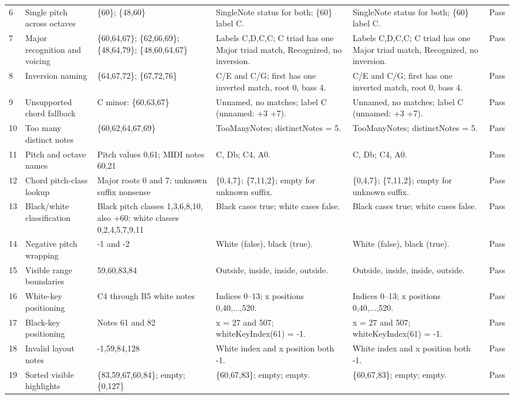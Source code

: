 \documentclass[10pt,letterpaper]{article}
\begin{document}
\begin{landscape}
\begin{longtable}{P{0.6cm}P{3.0cm}P{4.0cm}P{6.8cm}P{6.8cm}P{0.8cm}}
6 & Single pitch across octaves & \{60\}; \{48,60\} & SingleNote status for both; \{60\} label C. & SingleNote status for both; \{60\} label C. & Pass \\
7 & Major recognition and voicing & \{60,64,67\}; \{62,66,69\}; \{48,64,79\}; \{48,60,64,67\} & Labels C,D,C,C; C triad has one Major triad match, Recognized, no inversion. & Labels C,D,C,C; C triad has one Major triad match, Recognized, no inversion. & Pass \\
8 & Inversion naming & \{64,67,72\}; \{67,72,76\} & C/E and C/G; first has one inverted match, root 0, bass 4. & C/E and C/G; first has one inverted match, root 0, bass 4. & Pass \\
9 & Unsupported chord fallback & C minor: \{60,63,67\} & Unnamed, no matches; label C (unnamed: +3 +7). & Unnamed, no matches; label C (unnamed: +3 +7). & Pass \\
10 & Too many distinct notes & \{60,62,64,67,69\} & TooManyNotes; distinctNotes = 5. & TooManyNotes; distinctNotes = 5. & Pass \\
11 & Pitch and octave names & Pitch values 0,61; MIDI notes 60,21 & C, Db; C4, A0. & C, Db; C4, A0. & Pass \\
12 & Chord pitch-class lookup & Major roots 0 and 7; unknown suffix nonsense & \{0,4,7\}; \{7,11,2\}; empty for unknown suffix. & \{0,4,7\}; \{7,11,2\}; empty for unknown suffix. & Pass \\
13 & Black/white classification & Black pitch classes 1,3,6,8,10, also +60; white classes 0,2,4,5,7,9,11 & Black cases true; white cases false. & Black cases true; white cases false. & Pass \\
14 & Negative pitch wrapping & -1 and -2 & White (false), black (true). & White (false), black (true). & Pass \\
15 & Visible range boundaries & 59,60,83,84 & Outside, inside, inside, outside. & Outside, inside, inside, outside. & Pass \\
16 & White-key positioning & C4 through B5 white notes & Indices 0--13; x positions 0,40,...,520. & Indices 0--13; x positions 0,40,...,520. & Pass \\
17 & Black-key positioning & Notes 61 and 82 & x = 27 and 507; whiteKeyIndex(61) = -1. & x = 27 and 507; whiteKeyIndex(61) = -1. & Pass \\
18 & Invalid layout notes & -1,59,84,128 & White index and x position both -1. & White index and x position both -1. & Pass \\
19 & Sorted visible highlights & \{83,59,67,60,84\}; empty; \{0,127\} & \{60,67,83\}; empty; empty. & \{60,67,83\}; empty; empty. & Pass \\

\end{longtable}
\end{landscape}
\end{document}
